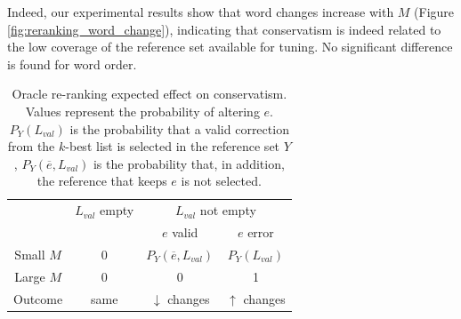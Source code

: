 \documentclass[letterpaper, 11pt]{article}
\begin{document}
Indeed, our experimental results show that word changes increase with $M$ (Figure \ref{fig:reranking_word_change}),
indicating that conservatism is indeed related to the low coverage of the reference set available for tuning.
No significant difference is found for word order.

\begin{table}[t]
	\vspace{-0.5cm}
	\centering
	\small
	\singlespacing
	\begin{tabular}{c|c|cc}
		 & $L_{val}$ empty & \multicolumn{2}{c}{$L_{val}$ not empty} \\
		&            & $e$ valid & $e$ error \\ \hline
		\multicolumn{1}{c|}{Small $M$} & 0 & $P_Y(\overline{e}, L_{val})$ & $P_Y\left(L_{val}\right)$    \\
		\multicolumn{1}{c|}{Large $M$} & 0 & 0              & 1                  \\ \hline
		\multicolumn{1}{c|}{Outcome}            & same  & $\downarrow$ changes        & $\uparrow$ changes
	\end{tabular}
	\caption{\label{ta:oracle_expected_results}
	Oracle re-ranking expected effect on conservatism.
	Values represent the probability of altering $e$. $P_Y\left(L_{val}\right)$ is the probability that a valid correction from the
	$k$-best list is selected in the reference set $Y$,
	$P_Y(\overline{e}, L_{val})$ is the probability that, in addition, the reference that keeps $e$ is not selected.
	}
	

\end{table}
%
\end{document}
